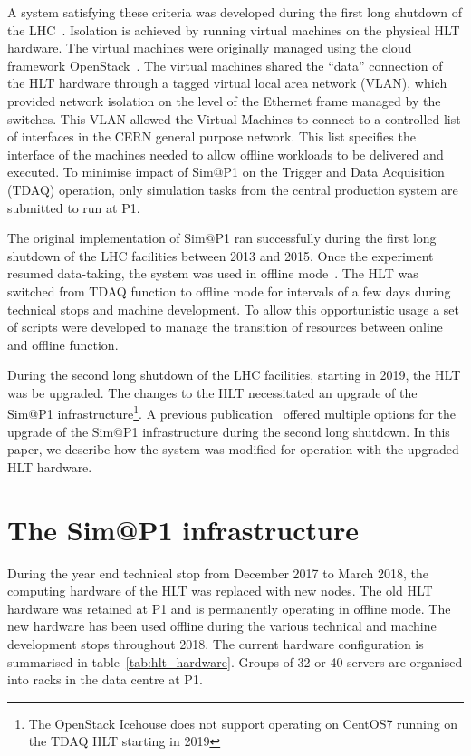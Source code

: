 \documentclass{webofc}
\begin{document}
A system satisfying these criteria was developed during the first long shutdown
of the LHC~\cite{Ballestrero:2015ypa}. Isolation is achieved by running virtual
machines on the physical HLT hardware. The virtual machines were originally
managed using
the cloud framework OpenStack~\cite{openstack}. The virtual machines shared the
``data'' connection of the HLT hardware through a tagged virtual local area
network (VLAN), which provided network
isolation on the level of the Ethernet frame managed by the switches. This VLAN
allowed the Virtual Machines to connect to a controlled list of interfaces in
the
CERN general purpose network. This list specifies the interface of the machines
needed to allow offline workloads to be delivered and executed. To minimise
impact of Sim@P1 on the Trigger and Data Acquisition (TDAQ) operation, only
simulation tasks from the central production system are submitted to run at P1.

The original implementation of Sim@P1 ran successfully during the first long
shutdown of the LHC facilities between 2013 and 2015. Once the experiment
resumed data-taking, the system was used in offline
mode~\cite{Ballestrero:2017psv}. The HLT was switched from TDAQ function to
offline mode for intervals of a few days during technical stops and machine
development. To allow this opportunistic usage a set of scripts were developed
to manage the transition of resources between online and offline function.

During the second long shutdown of the LHC facilities, starting in 2019,
the HLT
was be upgraded. The changes to the HLT necessitated an upgrade of the Sim@P1
infrastructure\footnote{The OpenStack Icehouse does not support operating on
CentOS7 running on the TDAQ HLT starting in 2019}. A previous
publication~\cite{Berghaus:2019wuj} offered multiple options for the upgrade of
the Sim@P1 infrastructure during the second long shutdown. In this paper, we
describe how the system was modified for operation with the upgraded HLT
hardware.

\section{The Sim@P1 infrastructure}
\label{sec:infra}
During the year end technical stop from December 2017 to March 2018, the
computing hardware of the HLT was replaced with new nodes. The old HLT hardware
was retained at P1 and is permanently operating in offline mode. The new
hardware has
been used offline during the various technical and machine development
stops throughout 2018. The current hardware configuration is summarised in
table~\ref{tab:hlt_hardware}. Groups of 32 or 40 servers are organised into
racks in the data centre at P1.
\end{document}
